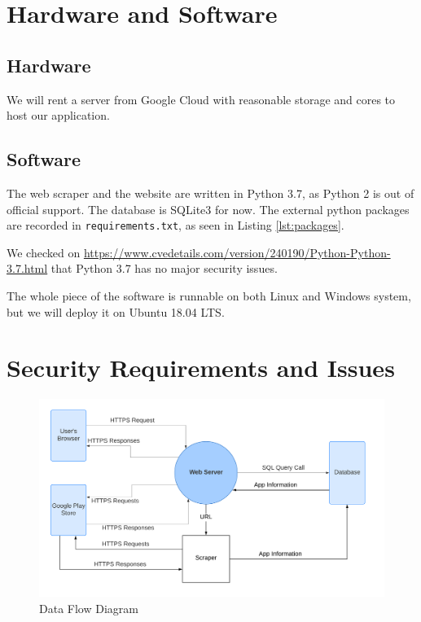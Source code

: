 \documentclass[12pt, a4paper]{article}
\def\overleafhome{/tmp}%
\newcommand{\code}[1]{\texttt{#1}}
\begin{document}
\section{Hardware and Software}
\subsection{Hardware}
We will rent a server from Google Cloud with reasonable storage and cores to host our application.

\subsection{Software}
The web scraper and the website are written in Python 3.7, as Python 2 is out of official support. The database is SQLite3 for now. The external python packages are recorded in \code{requirements.txt}, as seen in Listing \ref{lst:packages}.

We checked on \url{https://www.cvedetails.com/version/240190/Python-Python-3.7.html} that Python 3.7 has no major security issues.



The whole piece of the software is runnable on both Linux and Windows system, but we will deploy it on Ubuntu 18.04 LTS.


\section{Security Requirements and Issues}

\begin{figure}[ht]
\centering
\includegraphics[width=1\textwidth]{Data_Flow_Diagram.png}
\caption{Data Flow Diagram}
\label{fig:Data_Flow}
\end{figure}
\end{document}
